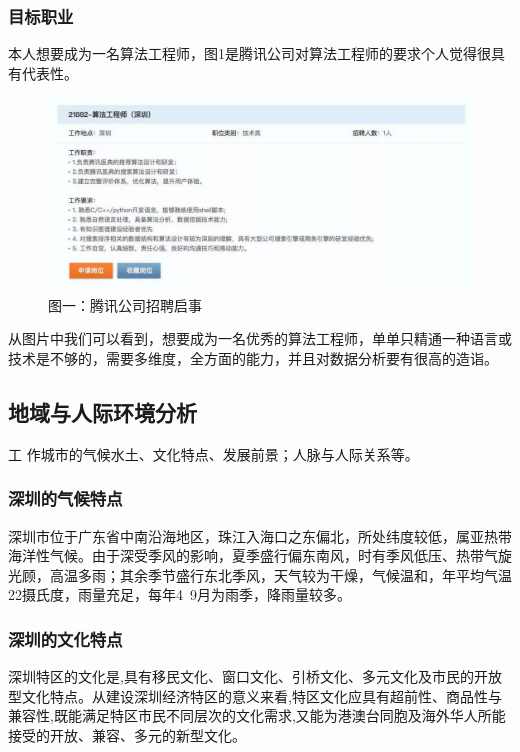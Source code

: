 \documentclass{article}
\begin{document}
\subsubsection{目标职业}
	本人想要成为一名算法工程师，图1是腾讯公司对算法工程师的要求个人觉得很具有代表性。\par
\begin{figure}[h!]
\centering
\includegraphics[scale=0.6]{1}
\caption{图一：腾讯公司招聘启事}
\label{fig:1}
\end{figure}

从图片中我们可以看到，想要成为一名优秀的算法工程师，单单只精通一种语言或技术是不够的，需要多维度，全方面的能力，并且对数据分析要有很高的造诣。\par

\subsection{地域与人际环境分析}

工 作城市的气候水土、文化特点、发展前景；人脉与人际关系等。\par
\par 
\subsubsection{深圳的气候特点}

深圳市位于广东省中南沿海地区，珠江入海口之东偏北，所处纬度较低，属亚热带海洋性气候。由于深受季风的影响，夏季盛行偏东南风，时有季风低压、热带气旋光顾，高温多雨；其余季节盛行东北季风，天气较为干燥，气候温和，年平均气温22摄氏度，雨量充足，每年4~9月为雨季，降雨量较多。

\subsubsection{深圳的文化特点}
深圳特区的文化是,具有移民文化、窗口文化、引桥文化、多元文化及市民的开放型文化特点。从建设深圳经济特区的意义来看,特区文化应具有超前性、商品性与兼容性,既能满足特区市民不同层次的文化需求,又能为港澳台同胞及海外华人所能接受的开放、兼容、多元的新型文化。
\end{document}
